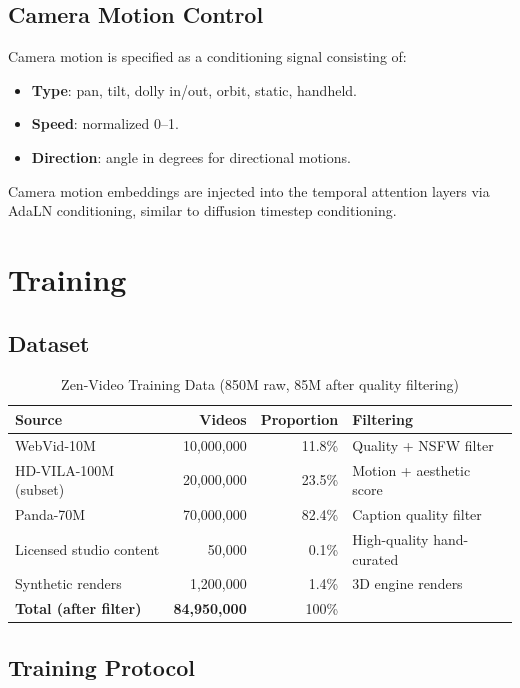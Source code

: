 \documentclass[11pt,a4paper]{article}
\begin{document}
\subsection{Camera Motion Control}

Camera motion is specified as a conditioning signal consisting of:
\begin{itemize}
    \item \textbf{Type}: pan, tilt, dolly in/out, orbit, static, handheld.
    \item \textbf{Speed}: normalized 0--1.
    \item \textbf{Direction}: angle in degrees for directional motions.
\end{itemize}

Camera motion embeddings are injected into the temporal attention layers via AdaLN conditioning,
similar to diffusion timestep conditioning.

\section{Training}

\subsection{Dataset}

\begin{table}[H]
\centering
\begin{tabular}{lrrl}
\toprule
\textbf{Source} & \textbf{Videos} & \textbf{Proportion} & \textbf{Filtering} \\
\midrule
WebVid-10M & 10,000,000 & 11.8\% & Quality + NSFW filter \\
HD-VILA-100M (subset) & 20,000,000 & 23.5\% & Motion + aesthetic score \\
Panda-70M & 70,000,000 & 82.4\% & Caption quality filter \\
Licensed studio content & 50,000 & 0.1\% & High-quality hand-curated \\
Synthetic renders & 1,200,000 & 1.4\% & 3D engine renders \\
\midrule
\textbf{Total (after filter)} & \textbf{84,950,000} & 100\% & \\
\bottomrule
\end{tabular}
\caption{Zen-Video Training Data (850M raw, 85M after quality filtering)}
\end{table}

\subsection{Training Protocol}
\end{document}
